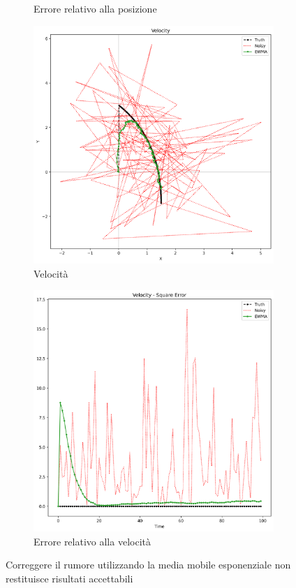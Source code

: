 \begin{figure}
\begin{subfigure}[b]{0.45\textwidth}
        \caption{Errore relativo alla posizione}
    \end{subfigure}
    \vfill
    \begin{subfigure}[b]{0.45\textwidth}
        \includegraphics[width=\textwidth]{images/vel0.png}
        \caption{Velocità}
    \end{subfigure}
    \hfill
    \begin{subfigure}[b]{0.45\textwidth}
        \includegraphics[width=\textwidth]{images/vel0err.png}
        \caption{Errore relativo alla velocità}
    \end{subfigure}
    \caption{Correggere il rumore utilizzando la media mobile esponenziale non restituisce risultati accettabili}
    \label{fig:lag}
\end{figure}

